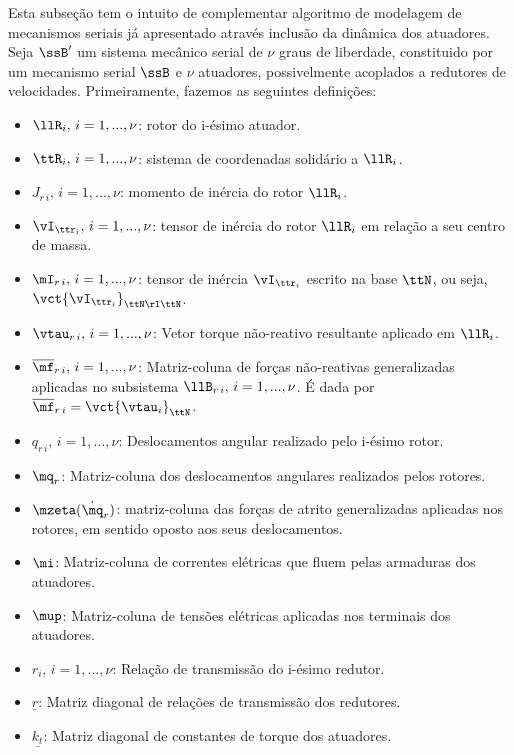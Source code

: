 \documentclass[]{politex}
\begin{document}
Esta subseção tem o intuito de complementar algoritmo de modelagem de mecanismos seriais já apresentado através inclusão da dinâmica dos atuadores. \\ 

Seja $\ssB'$ um sistema mecânico serial de $\nu$ graus de liberdade, constituido por um mecanismo serial $\ssB$ e $\nu$ atuadores, possivelmente acoplados a redutores de velocidades. Primeiramente, fazemos as seguintes definições:

\begin{itemize}
\item $\llR_i, \,i=1,...,\nu$: rotor do i-ésimo atuador.
\item $\ttR_i, \,i=1,...,\nu$: sistema de coordenadas solid\'ario a $\llR_i$.
\item $J_{r \,i}, \,i=1,...,\nu$: momento de inércia do rotor $\llR_i$.
\item $\vI_{\ttr_i}, \,i=1,...,\nu$: tensor de in\'ercia do rotor $\llR_i$ em relação a seu centro de massa.
\item $\mI_{r \,i}, \,i=1,...,\nu$: tensor de in\'ercia $\vI_{\ttr_i}$ escrito na base $\ttN$, ou seja, $\vct{\vI_{\ttr_i}}_{\ttN \rl \ttN}$.
\item $\vtau_{r \,i}, \,i=1,...,\nu$: Vetor torque não-reativo resultante aplicado em $\llR_i$.
\item $\overline{\mf}_{r \,i}, \,i=1,...,\nu$: Matriz-coluna de forças não-reativas generalizadas aplicadas no subsistema $\llB_{r \,i}, \,i=1,...,\nu$. É dada por $\overline{\mf}_{r \,i} = \vct{\vtau_i}_\ttN $.
\item $q_{r\,i}, \,i=1,...,\nu$: Deslocamentos angular realizado pelo i-ésimo rotor.
\item $\mq_r$: Matriz-coluna dos deslocamentos angulares realizados pelos rotores.
\item $\mzeta(\dot{\mq}_r)$: matriz-coluna das forças de atrito generalizadas aplicadas nos rotores, em sentido oposto aos seus deslocamentos.
\item $\mi$: Matriz-coluna de correntes elétricas que fluem pelas armaduras dos atuadores.
\item $\mup$: Matriz-coluna de tensões elétricas aplicadas nos terminais dos atuadores.
\item $r_i, \,i=1,...,\nu$: Relação de transmissão do i-ésimo redutor.
\item $\underline{r}$: Matriz diagonal de relações de transmissão dos redutores.
\item $\underline{k_t}$: Matriz diagonal de constantes de torque dos atuadores.

\end{itemize}
\end{document}
